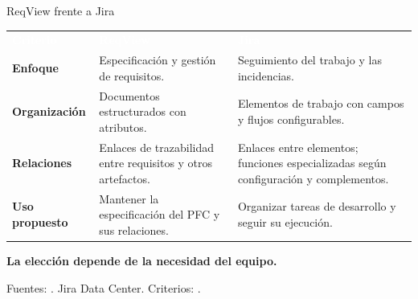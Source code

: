 \documentclass[aspectratio=169,11pt]{beamer}
\newcommand{\rvsource}[1]{%
  \vfill
  {\fontsize{7}{9}\selectfont
   \color{rvmuted}#1}
}
\begin{document}
\begin{frame}[t]{ReqView frente a Jira}

\vspace{0.22cm}

\begingroup

\setlength{\tabcolsep}{6pt}
\renewcommand{\arraystretch}{1.35}

\fontsize{9}{11}\selectfont
\raggedright

\begin{tabularx}{\textwidth}{
  >{\raggedright\arraybackslash}p{1.65cm}
  >{\raggedright\arraybackslash}X
  >{\raggedright\arraybackslash}X
}

\rowcolor{rvbrown}
\textcolor{white}{\textbf{Criterio}} &
\textcolor{white}{\textbf{ReqView}} &
\textcolor{white}{\textbf{Jira}} \\

\rowcolor{rvcream}
\textbf{Enfoque} &
Especificación y gestión de requisitos. &
Seguimiento del trabajo y las incidencias. \\

\textbf{Organización} &
Documentos estructurados con atributos. &
Elementos de trabajo con campos y flujos
configurables. \\

\rowcolor{rvcream}
\textbf{Relaciones} &
Enlaces de trazabilidad entre requisitos
y otros artefactos. &
Enlaces entre elementos; funciones
especializadas según configuración
y complementos. \\

\textbf{Uso propuesto} &
Mantener la especificación del PFC
y sus relaciones. &
Organizar tareas de desarrollo
y seguir su ejecución. \\

\hline

\end{tabularx}

\endgroup

\vspace{0.20cm}

{\small\bfseries\color{rvbrown}
La elección depende de la necesidad del equipo.\par}

\rvsource{
Fuentes:
\cite{reqviewproject,reqviewtraceability,jirarequirements}.
Jira Data Center.
Criterios: \cite{ozkaya2023tools}.
}

\end{frame}

\end{document}

